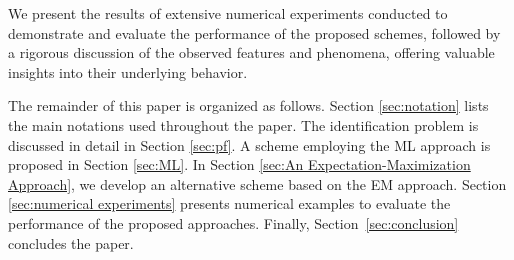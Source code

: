 \begin{itemize}
    We present the results of extensive numerical experiments conducted to demonstrate and evaluate the performance of the proposed schemes, followed by a rigorous discussion of the observed features and phenomena, offering valuable insights into their underlying behavior.
\end{itemize}

The remainder of this paper is organized as follows. Section \ref{sec:notation} lists the main notations used throughout the paper. The identification problem is discussed in detail in Section \ref{sec:pf}. A scheme employing the ML approach is proposed in Section \ref{sec:ML}. In Section \ref{sec:An Expectation-Maximization Approach}, we develop an alternative scheme based on the EM approach. Section \ref{sec:numerical experiments} presents numerical examples to evaluate the performance of the proposed approaches. Finally, Section~\ref{sec:conclusion} concludes the paper.